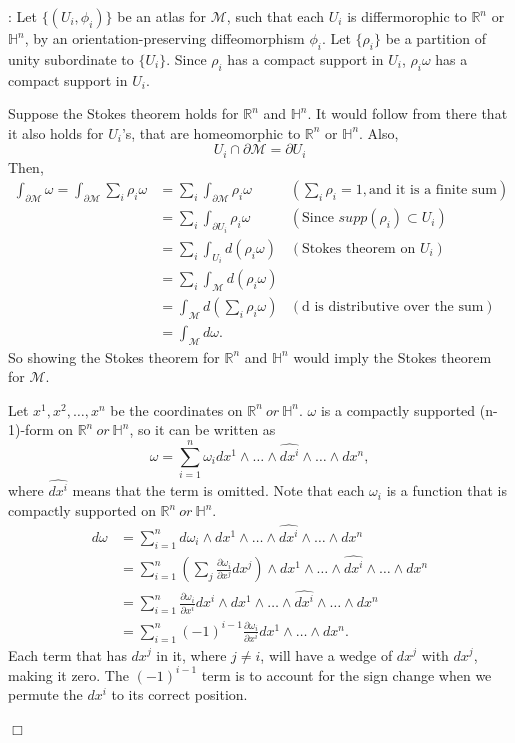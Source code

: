 \documentclass{article}
\def\endproofmark{$\Box$}
\newenvironment{proof}{\par\noindent{\bf Proof}:}{\endproofmark\smallskip}
\begin{document}
\begin{proof}
    Let $\{(U_i, \phi_i)\}$ be an atlas for $\mathcal{M}$, such that each $U_i$ is differmorophic to $\mathbb{R}^n$ or $\mathbb{H}^n$, by an orientation-preserving diffeomorphism $\phi_i$. Let $\{ \rho_i \}$ be a partition of unity subordinate to $\{ U_i \}$. Since $\rho_i$ has a compact support in $U_i$, $\rho_i \omega$ has a compact support in $U_i$. 

    Suppose the Stokes theorem holds for $\mathbb{R}^n$ and $\mathbb{H}^n$. It would follow from there that it also holds for $U_i$'s, that are homeomorphic to $\mathbb{R}^n$ or $\mathbb{H}^n$. 
    Also,
    \[
        U_i \cap \partial \mathcal{M} = \partial U_i 
    \]
    Then, 
    \begin{align*}
        \int_{\partial \mathcal{M}} \omega = \int_{\partial \mathcal{M}} \sum_i \rho_i \omega &= \sum_i \int_{\partial \mathcal{M}} \rho_i \omega & (\sum_i \rho_i = 1, \text{and it is a finite sum}) \\ 
        &= \sum_i \int_{\partial U_i} \rho_i \omega & (\text{Since } supp(\rho_i) \subset U_i) \\
        &= \sum_i \int_{U_i} d(\rho_i \omega) & (\text{Stokes theorem on } U_i) \\
        &= \sum_i \int_\mathcal{M} d(\rho_i \omega) \\
        &= \int_\mathcal{M} d(\sum_i \rho_i \omega) & (\text{d is distributive over the sum}) \\
        &= \int_\mathcal{M} d\omega .
    \end{align*}
    So showing the Stokes theorem for $\mathbb{R}^n$ and $\mathbb{H}^n$ would imply the Stokes theorem for $\mathcal{M}$.

    Let $x^1, x^2, \ldots, x^n$ be the coordinates on $\mathbb{R}^n  \ or \  \mathbb{H}^n$. $\omega$ is a compactly supported (n-1)-form on $\mathbb{R}^n \ or \ \mathbb{H}^n$, so it can be written as
    \[
        \omega = \sum_{i=1}^n \omega_i dx^1 \wedge \ldots \wedge \widehat{dx^i} \wedge \ldots \wedge dx^n,
    \]
    where $\widehat{dx^i}$ means that the term is omitted. Note that each $\omega_i$ is a function that is compactly supported on $\mathbb{R}^n \ or \ \mathbb{H}^n$. \\
    \begin{align*}
        d\omega &= \sum_{i=1}^n d\omega_i \wedge dx^1 \wedge \ldots \wedge \widehat{dx^i} \wedge \ldots \wedge dx^n \\
        &= \sum_{i=1}^n \left(\sum_j \frac{\partial \omega_i}{\partial x^j} dx^j\right) \wedge dx^1 \wedge \ldots \wedge \widehat{dx^i} \wedge \ldots \wedge dx^n\\
        &= \sum_{i=1}^n \frac{\partial \omega_i}{\partial x^i} dx^i \wedge dx^1 \wedge \ldots \wedge \widehat{dx^i} \wedge \ldots \wedge dx^n\\
        &= \sum_{i=1}^n (-1)^{i-1} \frac{\partial \omega_i}{\partial x^i} dx^1 \wedge \ldots \wedge dx^n .
    \end{align*}
    Each term that has $dx^j$ in it, where $j \neq i$, will have a wedge of $dx^j$ with $dx^j$, making it zero. The $(-1)^{i-1}$ term is to account for the sign change when we permute the $dx^i$ to its correct position.


\end{proof}
\end{document}

